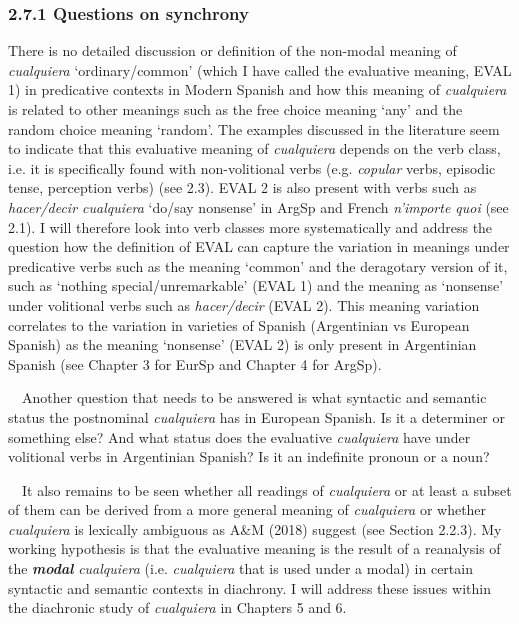 \subsubsection[2.7.1 Questions on synchrony]{\textbf{2.7.1 Questions}\textbf{ on synchrony}}
\begin{styleStandard}
There is no detailed discussion or definition of the non-modal meaning of \textit{cualquiera} ‘ordinary/common’ (which I have called the evaluative meaning, EVAL 1) in predicative contexts in Modern Spanish and how this meaning of \textit{cualquiera} is related to other meanings such as the free choice meaning ‘any’ and the random choice meaning ‘random’. The examples discussed in the literature seem to indicate that this evaluative meaning of \textit{cualquiera} depends on the verb class, i.e. it is specifically found with non-volitional verbs (e.g. \textit{copular} verbs, episodic tense, perception verbs) (see 2.3). EVAL 2 is also present with verbs such as \textit{hacer/decir cualquiera} ‘do/say nonsense’ in ArgSp and French \textit{n’importe quoi} (see 2.1). I will therefore look into verb classes more systematically and address the question how the definition of EVAL can capture the variation in meanings under predicative verbs such as the meaning ‘common’ and the deragotary version of it, such as ‘nothing special/unremarkable’ (EVAL 1) and the meaning as ‘nonsense’ under volitional verbs such as \textit{hacer/decir} (EVAL 2). This meaning variation correlates to the variation in varieties of Spanish (Argentinian vs European Spanish) as the meaning ‘nonsense’ (EVAL 2) is only present in Argentinian Spanish (see Chapter 3 for EurSp and Chapter 4 for ArgSp). 
\end{styleStandard}

\begin{styleStandard}
\ \ Another question that needs to be answered is what syntactic and semantic status the postnominal \textit{cualquiera} has in European Spanish. Is it a determiner or something else? And what status does the evaluative \textit{cualquiera} have under volitional verbs in Argentinian Spanish? Is it an indefinite pronoun or a noun?
\end{styleStandard}

\begin{styleStandard}
\ \ It also remains to be seen whether all readings of \textit{cualquiera} or at least a subset of them can be derived from a more general meaning of \textit{cualquiera} or whether \textit{cualquiera} is lexically ambiguous as A\&M (2018) suggest (see Section 2.2.3). My working hypothesis is that the evaluative meaning is the result of a reanalysis of the\textbf{ }\textbf{\textit{modal}}\textit{ cualquiera} (i.e. \textit{cualquiera} that is used under a modal) in certain syntactic and semantic contexts in diachrony. I will address these issues within the diachronic study of \textit{cualquiera} in Chapters 5 and 6.
\end{styleStandard}

